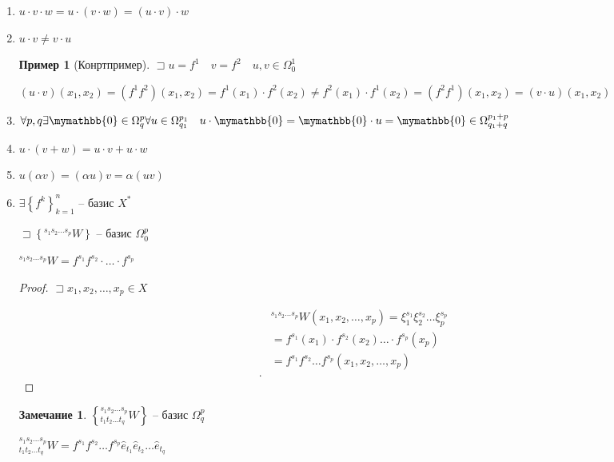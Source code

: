 \documentclass{book}
\theoremstyle{definition}
\newtheorem*{note}{Замечание}
\newtheorem*{example}{Пример}
\begin{document}
\begin{enumerate}
    \item $u\cdot v\cdot w = u\cdot \left( v\cdot w \right)  = \left( u\cdot v \right) \cdot w$
    \item $u\cdot v\neq v\cdot u$
        \begin{example}
            [Конртпример] $\sqsupset u = f^1\quad v = f^2\quad u, v\in \Omega^1_0$

            $\left( u\cdot v \right) \left( x_1, x_2 \right) =\left( f^1f^2 \right) \left( x_1, x_2 \right) = f^1(x_1)\cdot f^2(x_2) \neq f^2(x_1)\cdot f^1(x_2) = \left( f^2f^1 \right) (x_1, x_2) = \left( v\cdot u \right) \left( x_1, x_2 \right) $
        \end{example}
    \item $\forall p, q\exists \mymathbb{0}\in\Omega_q^p \forall u\in \Omega^{p_1}_{q_1}\quad u\cdot \mymathbb{0} = \mymathbb{0}\cdot u = \mymathbb{0}\in\Omega_{q_1+q}^{p_1+p}$
    \item $u\cdot \left( v+w \right)  = u\cdot v+u\cdot w$
    \item $u\left( \alpha v \right)  = \left( \alpha u \right) v = \alpha\left( uv \right) $
    \item $\exists \left\{ f^k \right\} _{k=1}^n$ -- базис $X^*$

        $\sqsupset \left\{ ^{s_1 s_2 \ldots s_p}W \right\} $ -- базис $\Omega_0^p$

        $^{s_1s_2\ldots s_p}W = f^{s_1}f^{s_2}\cdot \ldots\cdot f^{s_p}$
        \begin{proof}
            $\sqsupset x_1, x_2, \ldots, x_p\in X$

            \begin{align*}
                &^{s_1s_2 \ldots s_p}W\left( x_1, x_2, \ldots, x_p \right)  = \xi_1^{s_1}\xi_2^{s_2}\ldots\xi_p^{s_p}\\
                &= f^{s_1}(x_1)\cdot f^{s_2}(x_2)\ldots\cdot f^{s_p}(x_p) \\
                &= f^{s_1}f^{s_2}\ldots f^{s_p}\left( x_1, x_2, \ldots, x_p \right)  \\
           .\end{align*}
        \end{proof}
    \begin{note}
        $\left\{ ^{s_1 s_2 \ldots s_p}_{t_1 t_2 \ldots t_q}W \right\} $ -- базис $\Omega^p_q$

        $^{s_1 s_2 \ldots s_p}_{t_1 t_2 \ldots t_q}W = f^{s_1}f^{s_2}\ldots f^{s_p}\hat e_{t_1}\hat e_{t_2} \ldots \hat e_{t_q}$


\end{note}
\end{enumerate}
\end{document}
